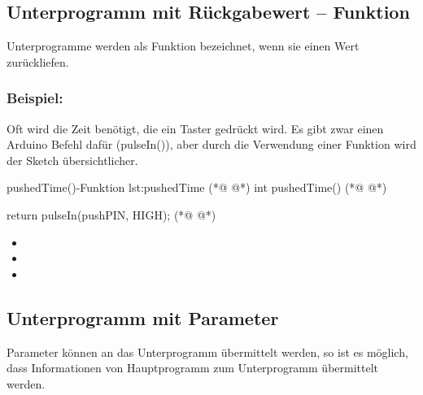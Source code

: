 \subsection{Unterprogramm mit Rückgabewert -- Funktion}
Unterprogramme werden als Funktion bezeichnet, wenn sie einen Wert zurückliefen.

\subsubsection{Beispiel: }

Oft wird die Zeit benötigt, die ein Taster gedrückt wird. Es gibt zwar einen Arduino Befehl dafür (pulseIn()), aber durch die Verwendung einer Funktion wird der Sketch übersichtlicher.  

\begin{multicols}{2}
\null\vfill
\begin{arduinoCode}{ pushedTime()-Funktion }{lst:pushedTime}
  (*@  @*)
int pushedTime()  (*@  @*)
{       
  return pulseIn(pushPIN, HIGH); (*@  @*)
  
}
\end{arduinoCode}

\vfill\null 
\columnbreak
\vfill\null 
\begin{itemize}
  \itemsep15pt
  \item[] 
  \item[] 
  \item[] 
 \end{itemize}
\vfill \null

\end{multicols}


\subsection{Unterprogramm mit Parameter}

Parameter können an das Unterprogramm übermittelt werden,
so ist es möglich, dass Informationen von Hauptprogramm zum Unterprogramm übermittelt werden.  


